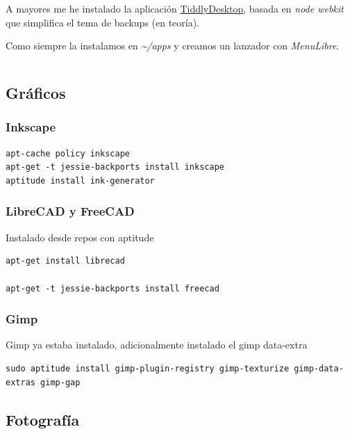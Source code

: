 \documentclass[12pt,spanish,]{article}
\begin{document}
A mayores me he instalado la aplicación
\href{https://github.com/Jermolene/TiddlyDesktop}{TiddlyDesktop}, basada
en \emph{node webkit} que simplifica el tema de backups (en teoría).

Como siempre la instalamos en \emph{\textasciitilde{}/apps} y creamos un
lanzador con \emph{MenuLibre}.

\begin{verbatim}
\end{verbatim}

\subsection{Gráficos}\label{gruxe1ficos}

\subsubsection{Inkscape}\label{inkscape}

\begin{verbatim}
apt-cache policy inkscape
apt-get -t jessie-backports install inkscape
aptitude install ink-generator
\end{verbatim}

\subsubsection{LibreCAD y FreeCAD}\label{librecad-y-freecad}

Instalado desde repos con aptitude

\begin{verbatim}
apt-get install librecad

apt-get -t jessie-backports install freecad
\end{verbatim}

\subsubsection{Gimp}\label{gimp}

Gimp ya estaba instalado, adicionalmente instalado el gimp data-extra

\begin{verbatim}
sudo aptitude install gimp-plugin-registry gimp-texturize gimp-data-extras gimp-gap
\end{verbatim}

\subsection{Fotografía}\label{fotografuxeda}
\end{document}
